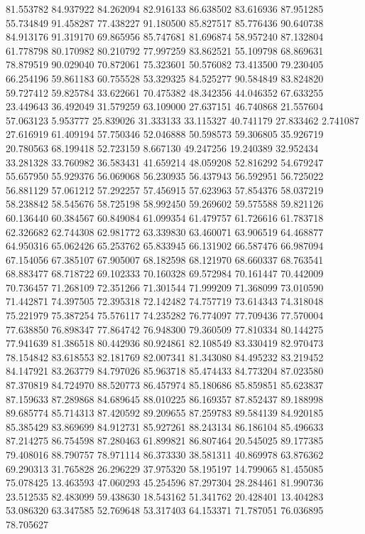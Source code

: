 81.553782
84.937922
84.262094
82.916133
86.638502
83.616936
87.951285
55.734849
91.458287
77.438227
91.180500
85.827517
85.776436
90.640738
84.913176
91.319170
69.865956
85.747681
81.696874
58.957240
87.132804
61.778798
80.170982
80.210792
77.997259
83.862521
55.109798
68.869631
78.879519
90.029040
70.872061
75.323601
50.576082
73.413500
79.230405
66.254196
59.861183
60.755528
53.329325
84.525277
90.584849
83.824820
59.727412
59.825784
33.622661
70.475382
48.342356
44.046352
67.633255
23.449643
36.492049
31.579259
63.109000
27.637151
46.740868
21.557604
57.063123
5.953777
25.839026
31.333133
33.115327
40.741179
27.833462
2.741087
27.616919
61.409194
57.750346
52.046888
50.598573
59.306805
35.926719
20.780563
68.199418
52.723159
8.667130
49.247256
19.240389
32.952434
33.281328
33.760982
36.583431
41.659214
48.059208
52.816292
54.679247
55.657950
55.929376
56.069068
56.230935
56.437943
56.592951
56.725022
56.881129
57.061212
57.292257
57.456915
57.623963
57.854376
58.037219
58.238842
58.545676
58.725198
58.992450
59.269602
59.575588
59.821126
60.136440
60.384567
60.849084
61.099354
61.479757
61.726616
61.783718
62.326682
62.744308
62.981772
63.339830
63.460071
63.906519
64.468877
64.950316
65.062426
65.253762
65.833945
66.131902
66.587476
66.987094
67.154056
67.385107
67.905007
68.182598
68.121970
68.660337
68.763541
68.883477
68.718722
69.102333
70.160328
69.572984
70.161447
70.442009
70.736457
71.268109
72.351266
71.301544
71.999209
71.368099
73.010590
71.442871
74.397505
72.395318
72.142482
74.757719
73.614343
74.318048
75.221979
75.387254
75.576117
74.235282
76.774097
77.709436
77.570004
77.638850
76.898347
77.864742
76.948300
79.360509
77.810334
80.144275
77.941639
81.386518
80.442936
80.924861
82.108549
83.330419
82.970473
78.154842
83.618553
82.181769
82.007341
81.343080
84.495232
83.219452
84.147921
83.263779
84.797026
85.963718
85.474433
84.773204
87.023580
87.370819
84.724970
88.520773
86.457974
85.180686
85.859851
85.623837
87.159633
87.289868
84.689645
88.010225
86.169357
87.852437
89.188998
89.685774
85.714313
87.420592
89.209655
87.259783
89.584139
84.920185
85.385429
83.869699
84.912731
85.927261
88.243134
86.186104
85.496633
87.214275
86.754598
87.280463
61.899821
86.807464
20.545025
89.177385
79.408016
88.790757
78.971114
86.373330
38.581311
40.869978
63.876362
69.290313
31.765828
26.296229
37.975320
58.195197
14.799065
81.455085
75.078425
13.463593
47.060293
45.254596
87.297304
28.284461
81.990736
23.512535
82.483099
59.438630
18.543162
51.341762
20.428401
13.404283
53.086320
63.347585
52.769648
53.317403
64.153371
71.787051
76.036895
78.705627
